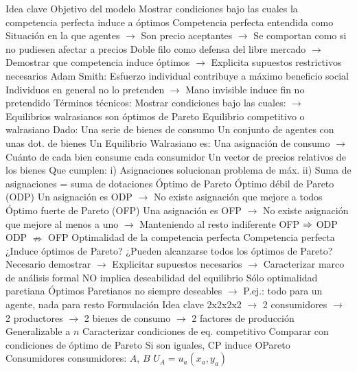 \documentclass{nuevotema}
\begin{document}
\begin{esquemal}
	\1 
		\2 Idea clave
			\3 Objetivo del modelo
				\4 Mostrar condiciones bajo las cuales
				\4[] la competencia perfecta induce a óptimos
				\4 Competencia perfecta entendida como
				\4[] Situación en la que agentes
				\4[] $\to$ Son precio aceptantes
				\4[] $\to$ Se comportan como si no pudiesen afectar a precios
				\4 Doble filo como defensa del libre mercado
				\4[] $\to$ Demostrar que competencia induce óptimos
				\4[] $\to$ Explicita supuestos restrictivos necesarios
				\4 Adam Smith:
				\4[] Esfuerzo individual contribuye a máximo beneficio social
				\4[] Individuos en general no lo pretenden
				\4[] $\to$ Mano invisible induce fin no pretendido
				\4 Términos técnicos:
				\4[] Mostrar condiciones bajo las cuales:
				\4[] $\to$ Equilibrios walrasianos son óptimos de Pareto
			\3 Equilibrio competitivo o walrasiano
				\4 Dado:
				\4[] Una serie de bienes de consumo
				\4[] Un conjunto de agentes con unas dot. de bienes
				\4 Un Equilibrio Walrasiano es:
				\4[] Una asignación de consumo
				\4[] $\to$ Cuánto de cada bien consume cada consumidor
				\4[] Un vector de precios relativos de los bienes
				\4 Que cumplen:
				\4[] i) Asignaciones solucionan problema de máx.
				\4[] ii) Suma de asignaciones = suma de dotaciones
			\3 Óptimo de Pareto
				\4 Óptimo débil de Pareto (ODP)
				\4[] Un asignación es ODP
				\4[] $\to$ No existe asignación que mejore a todos
				\4 Óptimo fuerte de Pareto (OFP)
				\4[] Una asignación es OFP
				\4[] $\to$ No existe asignación que mejore al menos a uno
				\4[] $\to$ Manteniendo al resto indiferente
				\4 OFP $\then$ ODP
				\4 ODP $\nRightarrow$ OFP
			\3 Optimalidad de la competencia perfecta
				\4 Competencia perfecta
				\4[] ¿Induce óptimos de Pareto?
				\4[] ¿Pueden alcanzarse todos los óptimos de Pareto?
				\4 Necesario demostrar
				\4[] $\to$ Explicitar supuestos necesarios
				\4[] $\to$ Caracterizar marco de análisis formal
				\4 NO implica deseabilidad del equilibrio
				\4[] Sólo optimalidad paretiana
				\4[] Óptimos Paretianos no siempre deseables
				\4[] $\to$ P.ej.: todo para un agente, nada para resto
		\2 Formulación
			\3 Idea clave
				\4 2x2x2x2
				\4[] $\to$ 2 consumidores
				\4[] $\to$ 2 productores
				\4[] $\to$ 2 bienes de consumo
				\4[] $\to$ 2 factores de producción
				\4 Generalizable a $n$
				\4 Caracterizar condiciones de eq. competitivo
				\4[$\to$] Comparar con condiciones de óptimo de Pareto
				\4[$\then$] Si son iguales, CP induce OPareto
			\3 Consumidores
				 consumidores: $A$, $B$
				\4[] $U_A = u_a(x_a, y_a)$

\end{esquemal}
\end{document}
